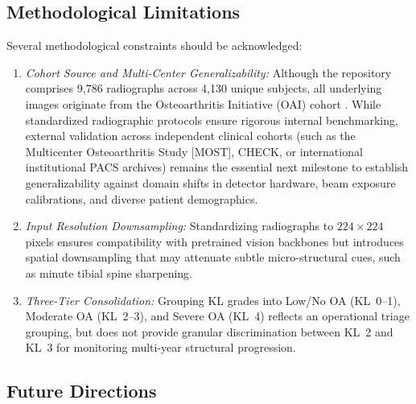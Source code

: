 \documentclass[10pt,journal]{IEEEtran}
\begin{document}
\subsection{Methodological Limitations}
\label{subsec:critical_limitations}

Several methodological constraints should be acknowledged:
\begin{enumerate}[leftmargin=*]
\item \textit{Cohort Source and Multi-Center Generalizability:} Although the repository comprises 9,786 radiographs across 4,130 unique subjects, all underlying images originate from the Osteoarthritis Initiative (OAI) cohort \cite{nevitt2006oai}. While standardized radiographic protocols ensure rigorous internal benchmarking, external validation across independent clinical cohorts (such as the Multicenter Osteoarthritis Study [MOST], CHECK, or international institutional PACS archives) remains the essential next milestone to establish generalizability against domain shifts in detector hardware, beam exposure calibrations, and diverse patient demographics.
\item \textit{Input Resolution Downsampling:} Standardizing radiographs to $224 \times 224$ pixels ensures compatibility with pretrained vision backbones but introduces spatial downsampling that may attenuate subtle micro-structural cues, such as minute tibial spine sharpening.
\item \textit{Three-Tier Consolidation:} Grouping KL grades into Low/No OA (KL~0--1), Moderate OA (KL~2--3), and Severe OA (KL~4) reflects an operational triage grouping, but does not provide granular discrimination between KL~2 and KL~3 for monitoring multi-year structural progression.
\end{enumerate}

\subsection{Future Directions}
\label{subsec:future_scope}
\end{document}

